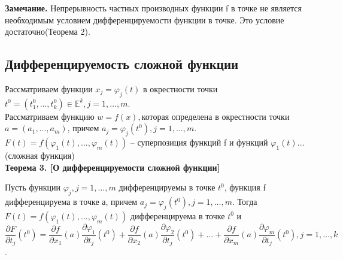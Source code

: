 \documentclass[a4paper,14pt]{article} %
\begin{document}
	 \textbf{Замечание.} Непрерывность частных производных функции f в точке не является необходимым условием дифференцируемости функции в точке. Это условие достаточно(Теорема 2).\\
	 
	 \subsection*{Дифференцируемость сложной функции}
	 
	 Рассматриваем функции $x_j = \varphi_j(t)$ в окрестности точки $t^0 = (t_1^0, \ldots, t_k^0)\in \mathds{E}^k, j = 1, \ldots, m$.\\
	 Рассматриваем функцию $w = f(x),$которая определена в окрестности точки $a = (a_1, \ldots, a_m)$, причем $a_j = \varphi_j(t^0), j = 1, \ldots, m$.\\
	 $F(t) = f(\varphi_1(t), \ldots, \varphi_m(t))$ -- суперпозиция функций f и функций $\varphi_1(t) \ldots$ (сложная функция)\\
	 
	 \textbf{Теорема 3. [О дифференцируемости сложной функции]}
	 
	 Пусть функции $\varphi_j, j = 1, \ldots, m$ дифференцируемы в точке $t^0$, функция f дифференцируема в точке а, причем $a_j = \varphi_j(t^0), j = 1, \ldots,m$. Тогда $F(t) = f(\varphi_1(t), \ldots, \varphi_m(t))$ дифференцируема в точке $t^0$ и 
	 \[\frac{\partial F}{\partial t_j}(t^0) = \frac{\partial f}{\partial x_1}(a) \frac{\partial \varphi_1}{\partial t_j}(t^0	) + \frac{\partial f}{\partial x_2}(a) \frac{\partial \varphi_2}{\partial t_j}(t^0	) + \ldots + \frac{\partial f}{\partial x_m}(a) \frac{\partial \varphi_m}{\partial t_j}(t^0), j = 1, \ldots, k\].
	 
\end{document}
